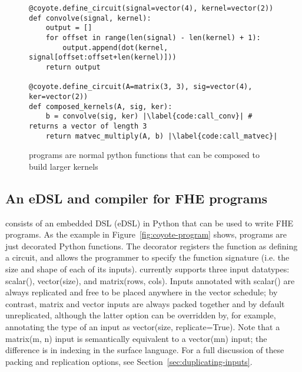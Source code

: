   
    

\begin{figure}
    \small
    \begin{verbatim}
@coyote.define_circuit(signal=vector(4), kernel=vector(2))
def convolve(signal, kernel):
    output = []
    for offset in range(len(signal) - len(kernel) + 1):
        output.append(dot(kernel, signal[offset:offset+len(kernel)]))
    return output
    
@coyote.define_circuit(A=matrix(3, 3), sig=vector(4), ker=vector(2))
def composed_kernels(A, sig, ker):
    b = convolve(sig, ker) |\label{code:call_conv}| # returns a vector of length 3
    return matvec_multiply(A, b) |\label{code:call_matvec}|
    \end{verbatim}
    \vspace{-1em}
    \caption{\system programs are normal python functions that can be composed to build larger kernels}\label{fig:coyote-programs-compose}
\end{figure}

\subsection{An eDSL and compiler for FHE programs}\label{sec:surface-language}
\system consists of an embedded DSL (eDSL) in Python that can be used to write FHE programs.
As the example in Figure~\ref{fig:coyote-program} shows, \system programs are just decorated Python functions.
The decorator registers the function as defining a \system circuit, and allows the programmer to specify the function signature (i.e. the size and shape of each of its inputs).
\system currently supports three input datatypes: {\sf scalar()}, {\sf vector(size)}, and {\sf matrix(rows, cols)}.
Inputs annotated with {\sf scalar()} are always replicated and free to be placed anywhere in the vector schedule; by contrast, {\sf matrix} and {\sf vector} inputs are always packed together and by default unreplicated, although the latter option can be overridden by, for example, annotating the type of an input as {\sf vector(size, replicate=True)}.
Note that a {\sf matrix(m, n)} input is semantically equivalent to a {\sf vector(mn)} input; the difference is in indexing in the surface language.
For a full discussion of these packing and replication options, see Section~\ref{sec:duplicating-inputs}. %

